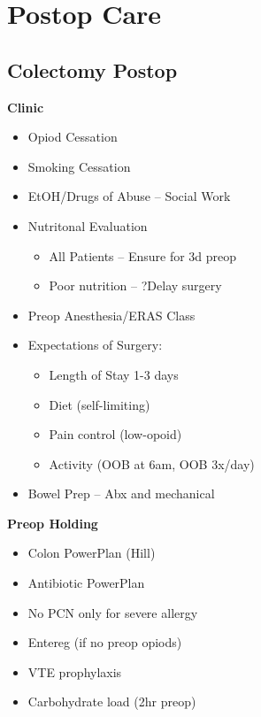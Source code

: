 \documentclass[
  letterpaper,
]{scrbook}
\providecommand{\tightlist}{%
  \setlength{\itemsep}{0pt}\setlength{\parskip}{0pt}}
\begin{document}
\part{Postop Care}

\chapter{Colectomy Postop}\label{colectomy-postop}

\textbf{Clinic}

\begin{itemize}
\tightlist
\item
  Opiod Cessation
\item
  Smoking Cessation
\item
  EtOH/Drugs of Abuse -- Social Work
\item
  Nutritonal Evaluation

  \begin{itemize}
  \tightlist
  \item
    All Patients -- Ensure for 3d preop
  \item
    Poor nutrition -- ?Delay surgery
  \end{itemize}
\item
  Preop Anesthesia/ERAS Class
\item
  Expectations of Surgery:

  \begin{itemize}
  \tightlist
  \item
    Length of Stay 1-3 days
  \item
    Diet (self-limiting)
  \item
    Pain control (low-opoid)
  \item
    Activity (OOB at 6am, OOB 3x/day)
  \end{itemize}
\item
  Bowel Prep -- Abx and mechanical
\end{itemize}

\textbf{Preop Holding}

\begin{itemize}
\tightlist
\item
  Colon PowerPlan (Hill)
\item
  Antibiotic PowerPlan
\item
  No PCN only for severe allergy
\item
  Entereg (if no preop opiods)
\item
  VTE prophylaxis
\item
  Carbohydrate load (2hr preop)
\end{itemize}
\end{document}
